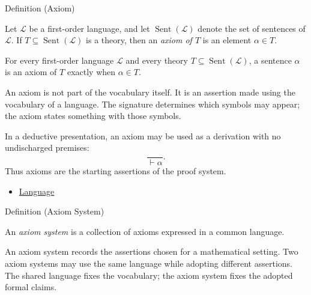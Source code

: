 \begin{definitionbox}{Definition (Axiom)}
\begin{definition}[Axiom]
\label{def:axiom}
Let $\mathcal{L}$ be a first-order language, and let
$\operatorname{Sent}(\mathcal{L})$ denote the set of sentences of
$\mathcal{L}$. If $T\subseteq \operatorname{Sent}(\mathcal{L})$ is a theory,
then an \emph{axiom of $T$} is an element $\alpha\in T$.
\end{definition}
\end{definitionbox}

\begin{remark*}
For every first-order language $\mathcal{L}$ and every theory
$T\subseteq\operatorname{Sent}(\mathcal{L})$, a sentence $\alpha$ is an axiom
of $T$ exactly when $\alpha\in T$.
\end{remark*}

\begin{remark*}[Interpretation]
An axiom is not part of the vocabulary itself. It is an assertion made using
the vocabulary of a language. The signature determines which symbols may
appear; the axiom states something with those symbols.
\end{remark*}

\begin{remark*}
In a deductive presentation, an axiom may be used as a derivation with no
undischarged premises:
\[
  \frac{}{\vdash \alpha}.
\]
Thus axioms are the starting assertions of the proof system.
\end{remark*}

\begin{dependencies}
\begin{itemize}
  \item \hyperref[def:language]{Language}
\end{itemize}
\end{dependencies}

\begin{definitionbox}{Definition (Axiom System)}
\begin{definition}
\label{def:axiom-system}
An \emph{axiom system} is a collection of axioms expressed in a common
language.
\end{definition}
\end{definitionbox}

\begin{remark*}[Interpretation]
An axiom system records the assertions chosen for a mathematical setting. Two
axiom systems may use the same language while adopting different assertions.
The shared language fixes the vocabulary; the axiom system fixes the adopted
formal claims.
\end{remark*}

